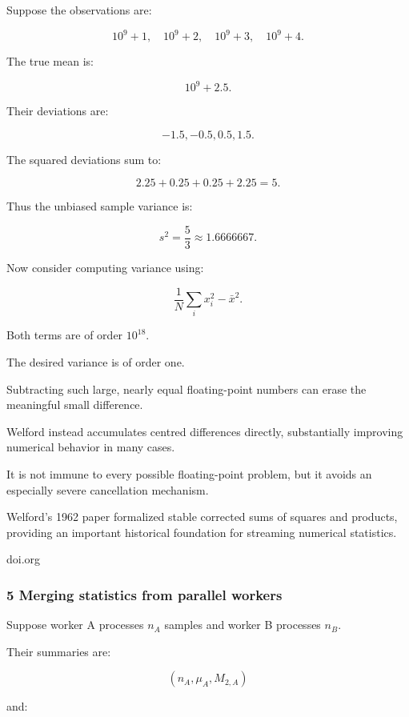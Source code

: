 \hypertarget{02-foundations-ii-ch030-why-naive-variance-is-numerically-dangerous}{}

Suppose the observations are:

\[
 10^9+1,\quad10^9+2,\quad10^9+3,\quad10^9+4.
\]

The true mean is:

\[
 10^9+2.5.
\]

Their deviations are:

\[
 -1.5,-0.5,0.5,1.5.
\]

The squared deviations sum to:

\[
 2.25+0.25+0.25+2.25=5.
\]

Thus the unbiased sample variance is:

\[
 \boxed{s^2=\frac53\approx1.6666667}.
\]

Now consider computing variance using:

\[
 \frac1N\sum_ix_i^2-\bar x^2.
\]

Both terms are of order \(10^{18}\).

The desired variance is of order one.

Subtracting such large, nearly equal floating-point numbers can erase the meaningful small difference.

Welford instead accumulates centred differences directly, substantially improving numerical behavior in many cases.

It is not immune to every possible floating-point problem, but it avoids an especially severe cancellation mechanism.

Welford's 1962 paper formalized stable corrected sums of squares and products, providing an important historical foundation for streaming numerical statistics.

doi.org

\subsubsection{5 Merging statistics from parallel workers}\label{02-foundations-ii-ch030-merging-statistics-from-parallel-workers}

\hypertarget{02-foundations-ii-ch030-merging-statistics-from-parallel-workers}{}

Suppose worker A processes \(n_A\) samples and worker B processes \(n_B\).

Their summaries are:

\[
 (n_A,\mu_A,M_{2,A})
\]

and:

